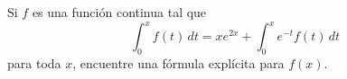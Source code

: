 \item Si $f$ es una función continua tal que 
    \[ \int_{0}^{x} f(t) \, dt = x e^{2x} + \int_{0}^{x} e^{-t} f(t) \, dt \]
    para toda $x$, encuentre una fórmula explícita para $f(x)$.
